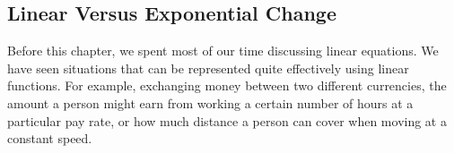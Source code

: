 %
%
%
%
%
%


\subsection{Linear Versus Exponential Change}

Before this chapter, we spent most of our time discussing linear equations. We have seen situations that can be represented quite effectively using linear functions. For example, exchanging money between two different currencies, the amount a person might earn from working a certain number of hours at a particular pay rate, or how much distance a person can cover when moving at a constant speed.

